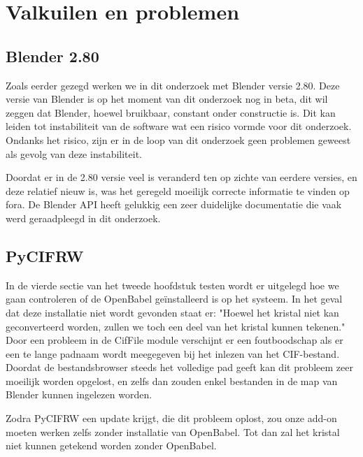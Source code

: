 \section{Valkuilen en problemen}

\subsection{Blender 2.80}
Zoals eerder gezegd werken we in dit onderzoek met Blender versie 2.80. Deze versie van Blender is op het moment van dit onderzoek nog in beta, dit wil zeggen dat Blender, hoewel bruikbaar, constant onder constructie is. Dit kan leiden tot instabiliteit van de software wat een risico vormde voor dit onderzoek. Ondanks het risico, zijn er in de loop van dit onderzoek geen problemen geweest als gevolg van deze instabiliteit.
\par
Doordat er in de 2.80 versie veel is veranderd ten op zichte van eerdere versies, en deze relatief nieuw is, was het geregeld moeilijk correcte informatie te vinden op fora. De Blender API heeft gelukkig een zeer duidelijke documentatie die vaak werd geraadpleegd in dit onderzoek.\citep*{BLEN3} 
\par


\subsection{PyCIFRW}
In de vierde sectie van het tweede hoofdstuk testen wordt er uitgelegd hoe we gaan controleren of de OpenBabel geïnstalleerd is op het systeem. In het geval dat deze installatie niet wordt gevonden staat er: "Hoewel het kristal niet kan geconverteerd worden, zullen we toch een deel van het kristal kunnen tekenen." Door een probleem in de CifFile module verschijnt er een foutboodschap als er een te lange padnaam wordt meegegeven bij het inlezen van het CIF-bestand. Doordat de bestandsbrowser steeds het volledige pad geeft kan dit probleem zeer moeilijk worden opgelost, en zelfs dan zouden enkel bestanden in de map van Blender kunnen ingelezen worden. 
\par
Zodra PyCIFRW een update krijgt, die dit probleem oplost, zou onze add-on moeten werken zelfs zonder installatie van OpenBabel. Tot dan zal het kristal niet kunnen getekend worden zonder OpenBabel.

